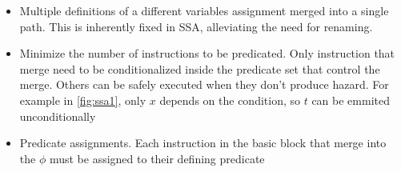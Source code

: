 \begin{itemize}
\item Multiple definitions of a different variables assignment merged into a single path. This is inherently fixed in SSA, alleviating the need for renaming.
\item Minimize the number of instructions to be predicated. Only instruction that merge need to be conditionalized inside the predicate set that control the merge. Others can be safely executed when they don't produce hazard. For example in \ref{fig:ssa1}, only $x$ depends on the condition, so $t$ can be emmited unconditionally
\item Predicate assignments. Each instruction in the basic block that merge into the $\phi$ must be assigned to their defining predicate
\end {itemize}

